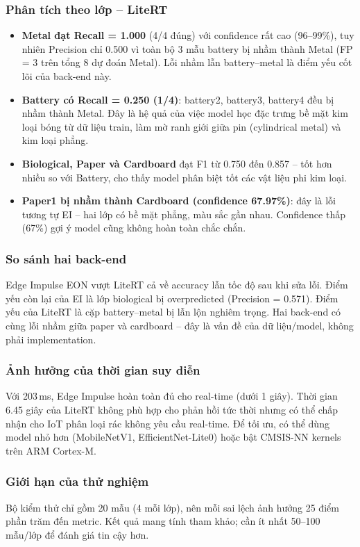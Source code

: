 \documentclass[12pt,a4paper]{article}
\begin{document}
\subsubsection*{Phân tích theo lớp -- LiteRT}

\begin{itemize}
  \item \textbf{Metal đạt Recall = 1.000} (4/4 đúng) với confidence rất cao (96--99\%), tuy nhiên Precision chỉ 0.500 vì toàn bộ 3 mẫu battery bị nhầm thành Metal (FP = 3 trên tổng 8 dự đoán Metal). Lỗi nhầm lẫn battery--metal là điểm yếu cốt lõi của back-end này.

  \item \textbf{Battery có Recall = 0.250 (1/4)}: battery2, battery3, battery4 đều bị nhầm thành Metal. Đây là hệ quả của việc model học đặc trưng bề mặt kim loại bóng từ dữ liệu train, làm mờ ranh giới giữa pin (cylindrical metal) và kim loại phẳng.

  \item \textbf{Biological, Paper và Cardboard} đạt F1 từ 0.750 đến 0.857 -- tốt hơn nhiều so với Battery, cho thấy model phân biệt tốt các vật liệu phi kim loại.

  \item \textbf{Paper1 bị nhầm thành Cardboard (confidence 67.97\%)}: đây là lỗi tương tự EI -- hai lớp có bề mặt phẳng, màu sắc gần nhau. Confidence thấp (67\%) gợi ý model cũng không hoàn toàn chắc chắn.
\end{itemize}

\subsubsection*{So sánh hai back-end}

Edge Impulse EON vượt LiteRT cả về accuracy lẫn tốc độ sau khi sửa lỗi. Điểm yếu còn lại của EI là lớp biological bị overpredicted (Precision = 0.571). Điểm yếu của LiteRT là cặp battery--metal bị lẫn lộn nghiêm trọng. Hai back-end có cùng lỗi nhầm giữa paper và cardboard -- đây là vấn đề của dữ liệu/model, không phải implementation.

\subsubsection*{Ảnh hưởng của thời gian suy diễn}

Với 203\,ms, Edge Impulse hoàn toàn đủ cho real-time (dưới 1 giây). Thời gian 6.45 giây của LiteRT không phù hợp cho phản hồi tức thời nhưng có thể chấp nhận cho IoT phân loại rác không yêu cầu real-time. Để tối ưu, có thể dùng model nhỏ hơn (MobileNetV1, EfficientNet-Lite0) hoặc bật CMSIS-NN kernels trên ARM Cortex-M.

\subsubsection*{Giới hạn của thử nghiệm}

Bộ kiểm thử chỉ gồm 20 mẫu (4 mỗi lớp), nên mỗi sai lệch ảnh hưởng 25 điểm phần trăm đến metric. Kết quả mang tính tham khảo; cần ít nhất 50--100 mẫu/lớp để đánh giá tin cậy hơn.
\end{document}
